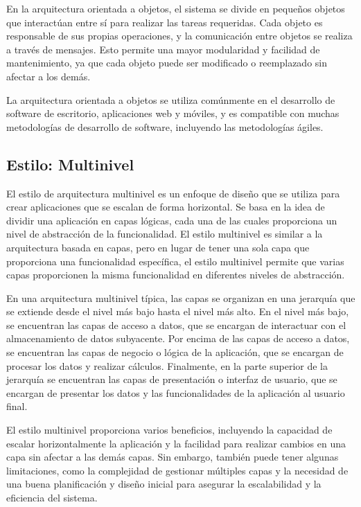 \documentclass[executivepaper]{article}
\begin{document}
En la arquitectura orientada a objetos, el sistema se divide en pequeños objetos que interactúan entre sí para realizar las tareas requeridas. Cada objeto es responsable de sus propias operaciones, y la comunicación entre objetos se realiza a través de mensajes. Esto permite una mayor modularidad y facilidad de mantenimiento, ya que cada objeto puede ser modificado o reemplazado sin afectar a los demás.

La arquitectura orientada a objetos se utiliza comúnmente en el desarrollo de software de escritorio, aplicaciones web y móviles, y es compatible con muchas metodologías de desarrollo de software, incluyendo las metodologías ágiles.

\subsection*{Estilo: Multinivel}
El estilo de arquitectura multinivel es un enfoque de diseño que se utiliza para crear aplicaciones que se escalan de forma horizontal. Se basa en la idea de dividir una aplicación en capas lógicas, cada una de las cuales proporciona un nivel de abstracción de la funcionalidad. El estilo multinivel es similar a la arquitectura basada en capas, pero en lugar de tener una sola capa que proporciona una funcionalidad específica, el estilo multinivel permite que varias capas proporcionen la misma funcionalidad en diferentes niveles de abstracción.

En una arquitectura multinivel típica, las capas se organizan en una jerarquía que se extiende desde el nivel más bajo hasta el nivel más alto. En el nivel más bajo, se encuentran las capas de acceso a datos, que se encargan de interactuar con el almacenamiento de datos subyacente. Por encima de las capas de acceso a datos, se encuentran las capas de negocio o lógica de la aplicación, que se encargan de procesar los datos y realizar cálculos. Finalmente, en la parte superior de la jerarquía se encuentran las capas de presentación o interfaz de usuario, que se encargan de presentar los datos y las funcionalidades de la aplicación al usuario final.

El estilo multinivel proporciona varios beneficios, incluyendo la capacidad de escalar horizontalmente la aplicación y la facilidad para realizar cambios en una capa sin afectar a las demás capas. Sin embargo, también puede tener algunas limitaciones, como la complejidad de gestionar múltiples capas y la necesidad de una buena planificación y diseño inicial para asegurar la escalabilidad y la eficiencia del sistema.
\end{document}
